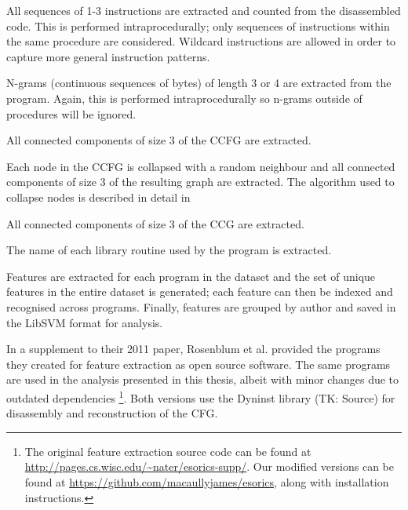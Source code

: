 \documentclass[a4paper,11pt]{kth-mag}
\begin{document}
\begin{description}[style=nextline]
\item[Idioms]
All sequences of 1-3 instructions are extracted and counted from the
disassembled code. This is performed intraprocedurally; only sequences of
instructions within the same procedure are considered. Wildcard instructions
are allowed in order to capture more general instruction patterns.

\item[N-grams]
N-grams (continuous sequences of bytes) of length 3 or 4 are extracted from
the program. Again, this is performed intraprocedurally so n-grams outside of
procedures will be ignored.

\item[Graphlets]
All connected components of size 3 of the CCFG are extracted.

\item[Supergraphlets]
Each node in the CCFG is collapsed with a random neighbour and all connected
components of size 3 of the resulting graph are extracted. The algorithm used
to collapse nodes is described in detail in \parencite{rosenblum2011recovering} 

\item[Call graphlets]
All connected components of size 3 of the CCG are extracted.

\item[External interaction]
The name of each library routine used by the program is extracted.
\end{description}

Features are extracted for each program in the dataset and the set of unique
features in the entire dataset is generated; each feature can then be indexed
and recognised across programs. Finally, features are grouped by author and
saved in the LibSVM format \parencite{chang2011libsvm}
for analysis. 

In a supplement to their 2011 paper, Rosenblum et al. provided the programs
they created for feature extraction as open source software. The same programs
are used in the analysis presented in this thesis, albeit with minor changes
due to outdated dependencies \footnote{
    The original feature extraction source code can be found at
    \url{http://pages.cs.wisc.edu/~nater/esorics-supp/}. Our modified versions
    can be found at \url{https://github.com/macaullyjames/esorics}, along with
    installation instructions.
}. Both versions use the Dyninst library (TK: Source) for disassembly and
reconstruction of the CFG.
\end{document}
